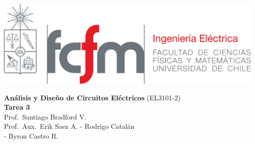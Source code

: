 \documentclass[
  11pt,
  letterpaper,
   addpoints,
  ]{exam}
\begin{document}
\noindent
\begin{minipage}{0.47\textwidth}
\includegraphics[width=\textwidth]{../fcfm_die}
\end{minipage}
\begin{minipage}{0.53\textwidth}
    
\begin{center} 
\large\textbf{Análisis y Diseño de Circuitos Eléctricos} (EL3101-2) \\
\large\textbf{Tarea 3} \\
\normalsize Prof.~Santiago Bradford V.\\
\normalsize Prof.~Aux.~Erik Saez A. - Rodrigo Catalán\\
             - Byron Castro R.
\end{center}
\end{minipage}

\vspace{0.5cm}
\noindent
\vspace{.85cm}

\end{document}
